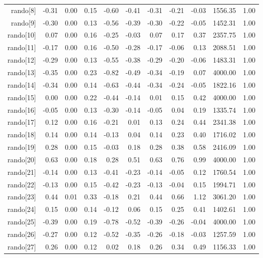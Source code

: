 \begin{table}[ht]
\begin{tabular}{rrrrrrrrrrr}
  rando[8] & -0.31 & 0.00 & 0.15 & -0.60 & -0.41 & -0.31 & -0.21 & -0.03 & 1556.35 & 1.00 \\ 
  rando[9] & -0.30 & 0.00 & 0.13 & -0.56 & -0.39 & -0.30 & -0.22 & -0.05 & 1452.31 & 1.00 \\ 
  rando[10] & 0.07 & 0.00 & 0.16 & -0.25 & -0.03 & 0.07 & 0.17 & 0.37 & 2357.75 & 1.00 \\ 
  rando[11] & -0.17 & 0.00 & 0.16 & -0.50 & -0.28 & -0.17 & -0.06 & 0.13 & 2088.51 & 1.00 \\ 
  rando[12] & -0.29 & 0.00 & 0.13 & -0.55 & -0.38 & -0.29 & -0.20 & -0.06 & 1483.31 & 1.00 \\ 
  rando[13] & -0.35 & 0.00 & 0.23 & -0.82 & -0.49 & -0.34 & -0.19 & 0.07 & 4000.00 & 1.00 \\ 
  rando[14] & -0.34 & 0.00 & 0.14 & -0.63 & -0.44 & -0.34 & -0.24 & -0.05 & 1822.16 & 1.00 \\ 
  rando[15] & 0.00 & 0.00 & 0.22 & -0.44 & -0.14 & 0.01 & 0.15 & 0.42 & 4000.00 & 1.00 \\ 
  rando[16] & -0.05 & 0.00 & 0.13 & -0.30 & -0.14 & -0.05 & 0.04 & 0.19 & 1335.74 & 1.00 \\ 
  rando[17] & 0.12 & 0.00 & 0.16 & -0.21 & 0.01 & 0.13 & 0.24 & 0.44 & 2341.38 & 1.00 \\ 
  rando[18] & 0.14 & 0.00 & 0.14 & -0.13 & 0.04 & 0.14 & 0.23 & 0.40 & 1716.02 & 1.00 \\ 
  rando[19] & 0.28 & 0.00 & 0.15 & -0.03 & 0.18 & 0.28 & 0.38 & 0.58 & 2416.09 & 1.00 \\ 
  rando[20] & 0.63 & 0.00 & 0.18 & 0.28 & 0.51 & 0.63 & 0.76 & 0.99 & 4000.00 & 1.00 \\ 
  rando[21] & -0.14 & 0.00 & 0.13 & -0.41 & -0.23 & -0.14 & -0.05 & 0.12 & 1760.54 & 1.00 \\ 
  rando[22] & -0.13 & 0.00 & 0.15 & -0.42 & -0.23 & -0.13 & -0.04 & 0.15 & 1994.71 & 1.00 \\ 
  rando[23] & 0.44 & 0.01 & 0.33 & -0.18 & 0.21 & 0.44 & 0.66 & 1.12 & 3061.20 & 1.00 \\ 
  rando[24] & 0.15 & 0.00 & 0.14 & -0.12 & 0.06 & 0.15 & 0.25 & 0.41 & 1402.61 & 1.00 \\ 
  rando[25] & -0.39 & 0.00 & 0.19 & -0.78 & -0.52 & -0.39 & -0.26 & -0.04 & 4000.00 & 1.00 \\ 
  rando[26] & -0.27 & 0.00 & 0.12 & -0.52 & -0.35 & -0.26 & -0.18 & -0.03 & 1257.59 & 1.00 \\ 
  rando[27] & 0.26 & 0.00 & 0.12 & 0.02 & 0.18 & 0.26 & 0.34 & 0.49 & 1156.33 & 1.00 \\ 

\end{tabular}
\end{table}
